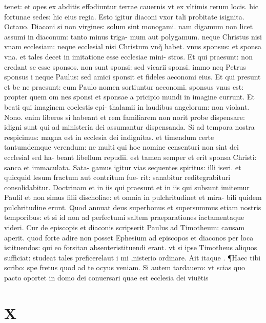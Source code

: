 \documentclass{article}
\begin{document}
\begin{pages}
tenet: et opes ex abditis effodiuntur terrae cauernis vt ex vltimis rerum locis. hic fortunae sedes: hic eius regia. Esto igitur diaconi vxor tali probitate isignita. Octauo. Diaconi si non virgines: solum sint monogami. nam digamum non licet assumi in diaconum: tanto minus triga- mum aut polygamum. neque Christus nisi vnam ecclesiam: neque ecclesial nisi Christum vnq̃ habet. vnus sponsus: et sponsa vna. et tales decet in imitatione esse ecclesiae mini- stros. Et qui praesunt: non credant se esse sponsos. non sunt sponsi: sed vicarii sponsi. immo neq Petrus sponsus i neque Paulus: sed amici sponsit et fideles aeconomi eius. Et qui presunt et be ne praesunt: cum Paulo nomen sortiuntur aeconomi. sponsus vnus est: propter quem om nes sponsi et sponsae a pricipio mundi in imagine currunt. Et beati qui imaginem coelestis epi- thalamii in laudibus angelorum: non violant. Nono. enim liberos si habeant et rem familiarem non norit probe dispensare: idigni sunt qui ad ministeria dei assumantur dispensanda. Si ad tempora nostra respicimus: magna est in ecclesia dei indignitas. et timendum certe tantumdemque verendum: ne multi qui hoc nomine censenturi non sint dei ecclesial sed ha- beant libellum repudii. est tamen semper et erit sponsa Christi: sanca et immaculata. Sata- gamus igitur vias sequentes spiritus: illi iseri. et quicquid lesum fractum aut contritum fue- rit: sanabitur reditegrabituri consolidabitur. Doctrinam et in iis qui praesunt et in iis qui subsunt imitemur Paulil et non simus filii discholiae: et omnia in pulchritudinet et mira- bili quidem pulchritudine erunt. Quod annuat deus superbonus et supersummus etiam nostris temporibus: et si id non ad perfectumi saltem praeparationes iactamentaque videri. Cur de episcopis et diaconis scripserit Paulus ad Timotheum: causam aperit. quod forte adire non posset Ephesium ad episcopos et diaconos per loca istituendos: qui eo forsitan absenteristituendi erant. vt si ipse Timotheus aliquos sufficiat: studeat tales preficerelaut i mi ,nisterio ordinare. Ait itaque . ¶Haec tibi scribo: spe fretus quod ad te ocyus veniam. Si autem  tardauero: vt scias quo pacto oportet in domo dei conuersari quae est ecclesia dei viuëtis  \pend
\section*{X }

\end{pages}
\end{document}
